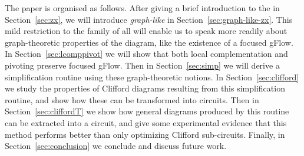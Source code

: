 \documentclass[a4paper,onecolumn,superscriptaddress,11pt,accepted=2020-04-27]{quantumarticle}
\theoremstyle{definition}
\begin{document}


The paper is organised as follows. After giving a brief introduction to the \zxcalculus in Section~\ref{sec:zx}, we will introduce \emph{graph-like} \zxdiagrams in Section~\ref{sec:graph-like-zx}. 
This mild restriction to the family of all \zxdiagrams will enable us to speak more readily about graph-theoretic properties of the diagram, like the existence of a focused gFlow. 
In Section~\ref{sec:lcomppivot} we will show that both local complementation and pivoting preserve focused gFlow. 
Then in Section~\ref{sec:simp} we will derive a simplification routine using these graph-theoretic notions.
In Section~\ref{sec:clifford} we study the properties of Clifford diagrams resulting from this simplification routine, and show how these can be transformed into circuits.
Then in Section~\ref{sec:cliffordT} we show how general diagrams produced by this routine can be extracted into a circuit,
and give some experimental evidence that this method performs better
than only optimizing Clifford sub-circuits. Finally, in
Section~\ref{sec:conclusion} we conclude and discuss future work.
\end{document}
